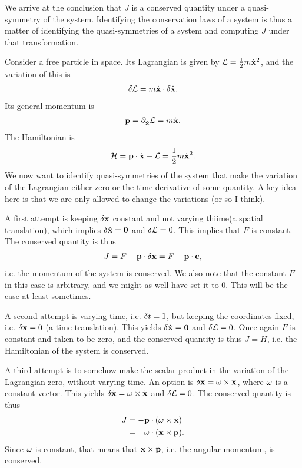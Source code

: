 We arrive at the conclusion that $J$ is a conserved quantity under a quasi-symmetry of the system. Identifying the conservation laws of a system is thus a matter of identifying the quasi-symmetries of a system and computing $J$ under that transformation.

Consider a free particle in space. Its Lagrangian is given by $\mathcal{L} = \frac{1}{2}m\dot{\vb{x}}^{2}$, and the variation of this is
\begin{align*}
	\delta \mathcal{L} = m\dot{\vb{x}}\cdot\delta \dot{\vb{x}}.
\end{align*}
Its general momentum is
\begin{align*}
	\vb{p} = \partial^{}_{\dot{\vb{x}}}\mathcal{L} = m\dot{\vb{x}}.
\end{align*}
The Hamiltonian is
\begin{align*}
	\mathcal{H} = \vb{p}\cdot\dot{\vb{x}} - \mathcal{L} = \frac{1}{2}m\dot{\vb{x}}^{2}.
\end{align*}
We now want to identify quasi-symmetries of the system that make the variation of the Lagrangian either zero or the time derivative of some quantity. A key idea here is that we are only allowed to change the variations (or so I think).

A first attempt is keeping $\delta \vb{x}$ constant and not varying thiime(a spatial translation), which implies $\delta \dot{\vb{x}} = \vb{0}$ and $\delta \mathcal{L} = 0$. This implies that $F$ is constant. The conserved quantity is thus
\begin{align*}
	J = F - \vb{p}\cdot\delta \vb{x} = F - \vb{p}\cdot\vb{c},
\end{align*}
i.e. the momentum of the system is conserved. We also note that the constant $F$ in this case is arbitrary, and we might as well have set it to $0$. This will be the case at least sometimes.

A second attempt is varying time, i.e. $\delta t = 1$, but keeping the coordinates fixed, i.e. $\delta \vb{x} = 0$ (a time translation). This yields $\delta \dot{\vb{x}} = \vb{0}$ and $\delta \mathcal{L} = 0$. Once again $F$ is constant and taken to be zero, and the conserved quantity is thus $J = H$, i.e. the Hamiltonian of the system is conserved.

A third attempt is to somehow make the scalar product in the variation of the Lagrangian zero, without varying time. An option is $\delta \vb{x} = \vb{\omega}\times\vb{x}$, where $\vb{\omega}$ is a constant vector. This yields $\delta \dot{\vb{x}} = \vb{\omega}\times\dot{\vb{x}}$ and $\delta \mathcal{L} = 0$. The conserved quantity is thus
\begin{align*}
	J &= -\vb{p}\cdot(\vb{\omega}\times\vb{x}) \\
	  &= -\vb{\omega}\cdot(\vb{x}\times\vb{p}).
\end{align*}
Since $\vb{\omega}$ is constant, that means that $\vb{x}\times\vb{p}$, i.e. the angular momentum, is conserved.

